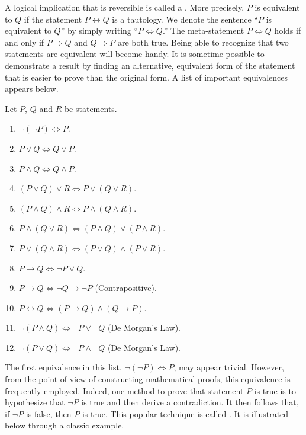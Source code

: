 A logical implication that is reversible is called a .
More precisely, $P$ is equivalent to $Q$ if the statement $P \leftrightarrow Q$ is a tautology.
We denote the sentence ``$P$ is equivalent to $Q$'' by simply writing ``$P \Leftrightarrow Q$.''
The meta-statement $P \Leftrightarrow Q$ holds if and only if $P \Rightarrow Q$ and $Q \Rightarrow P$ are both true.
Being able to recognize that two statements are equivalent will become handy.
It is sometime possible to demonstrate a result by finding an alternative, equivalent form of the statement that is easier to prove than the original form.
A list of important equivalences appears below.

\begin{fact}
Let $P$, $Q$ and $R$ be statements.
\begin{enumerate}
\item $\neg (\neg P) \Leftrightarrow P$.
\item $P \vee Q \Leftrightarrow Q \vee P$.
\item $P \wedge Q \Leftrightarrow Q \wedge P$.
\item $(P \vee Q) \vee R \Leftrightarrow P \vee (Q \vee R)$.
\item $(P \wedge Q) \wedge R \Leftrightarrow P \wedge (Q \wedge R)$.
\item $P \wedge (Q \vee R) \Leftrightarrow (P \wedge Q) \vee (P \wedge R)$.
\item $P \vee (Q \wedge R) \Leftrightarrow (P \vee Q) \wedge (P \vee R)$.
\item $P \rightarrow Q \Leftrightarrow \neg P \vee Q$.
\item $P \rightarrow Q \Leftrightarrow \neg Q \rightarrow \neg P$ (Contrapositive).
\item $P \leftrightarrow Q \Leftrightarrow (P \rightarrow Q) \wedge (Q \rightarrow P)$.
\item $\neg (P \wedge Q) \Leftrightarrow \neg P \vee \neg Q$ (De Morgan's Law).
\item $\neg (P \vee Q) \Leftrightarrow \neg P \wedge \neg Q$ (De Morgan's Law).
\end{enumerate}
\end{fact}

The first equivalence in this list, $\neg (\neg P) \Leftrightarrow P$, may appear trivial.
However, from the point of view of constructing mathematical proofs, this equivalence is frequently employed.
Indeed, one method to prove that statement $P$ is true is to hypothesize that $\neg P$ is true and then derive a contradiction.
It then follows that, if $\neg P$ is false, then $P$ is true.
This popular technique is called .
It is illustrated below through a classic example.


